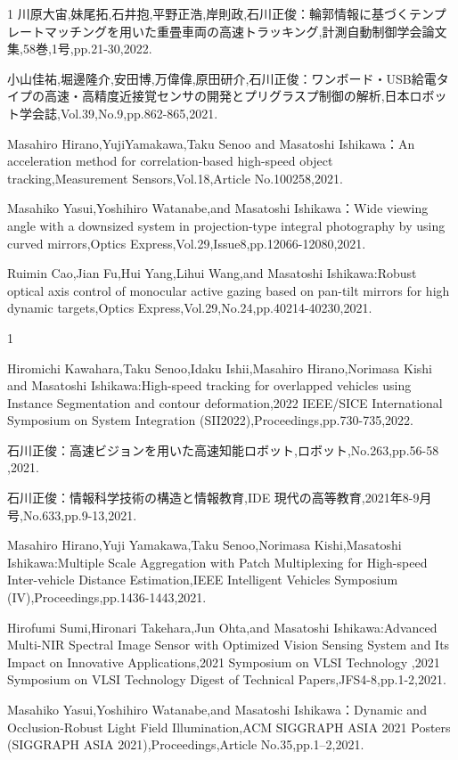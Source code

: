 \begin{雑誌論文}{1}
川原大宙,妹尾拓,石井抱,平野正浩,岸則政,石川正俊：輪郭情報に基づくテンプレートマッチングを用いた重畳車両の高速トラッキング,計測自動制御学会論文集,58巻,1号,pp.21-30,2022.

小山佳祐,堀邊隆介,安田博,万偉偉,原田研介,石川正俊：ワンボード・USB給電タイプの高速・高精度近接覚センサの開発とプリグラスプ制御の解析,日本ロボット学会誌,Vol.39,No.9,pp.862-865,2021.

Masahiro Hirano,YujiYamakawa,Taku Senoo and Masatoshi Ishikawa：An acceleration method for correlation-based high-speed object tracking,Measurement Sensors,Vol.18,Article No.100258,2021.

Masahiko Yasui,Yoshihiro Watanabe,and Masatoshi Ishikawa：Wide viewing angle with a downsized system in projection-type integral photography by using curved mirrors,Optics Express,Vol.29,Issue8,pp.12066-12080,2021.

Ruimin Cao,Jian Fu,Hui Yang,Lihui Wang,and Masatoshi Ishikawa:Robust optical axis control of monocular active gazing based on pan-tilt mirrors for high dynamic targets,Optics Express,Vol.29,No.24,pp.40214-40230,2021.

\end{雑誌論文}

\begin{査読付}{1}

Hiromichi Kawahara,Taku Senoo,Idaku Ishii,Masahiro Hirano,Norimasa Kishi and Masatoshi Ishikawa:High-speed tracking for overlapped vehicles using Instance Segmentation and contour deformation,2022 IEEE/SICE International Symposium on System Integration (SII2022),Proceedings,pp.730-735,2022.

石川正俊：高速ビジョンを用いた高速知能ロボット,ロボット,No.263,pp.56-58 ,2021.

石川正俊：情報科学技術の構造と情報教育,IDE 現代の高等教育,2021年8-9月号,No.633,pp.9-13,2021.

Masahiro Hirano,Yuji Yamakawa,Taku Senoo,Norimasa Kishi,Masatoshi Ishikawa:Multiple Scale Aggregation with Patch Multiplexing for High-speed Inter-vehicle Distance Estimation,IEEE Intelligent Vehicles Symposium (IV),Proceedings,pp.1436-1443,2021.

Hirofumi Sumi,Hironari Takehara,Jun Ohta,and Masatoshi Ishikawa:Advanced Multi-NIR Spectral Image Sensor with Optimized Vision Sensing System and Its Impact on Innovative Applications,2021 Symposium on VLSI Technology ,2021 Symposium on VLSI Technology Digest of Technical Papers,JFS4-8,pp.1-2,2021.

Masahiko Yasui,Yoshihiro Watanabe,and Masatoshi Ishikawa：Dynamic and Occlusion-Robust Light Field Illumination,ACM SIGGRAPH ASIA 2021 Posters (SIGGRAPH ASIA 2021),Proceedings,Article No.35,pp.1–2,2021.

\end{査読付}


